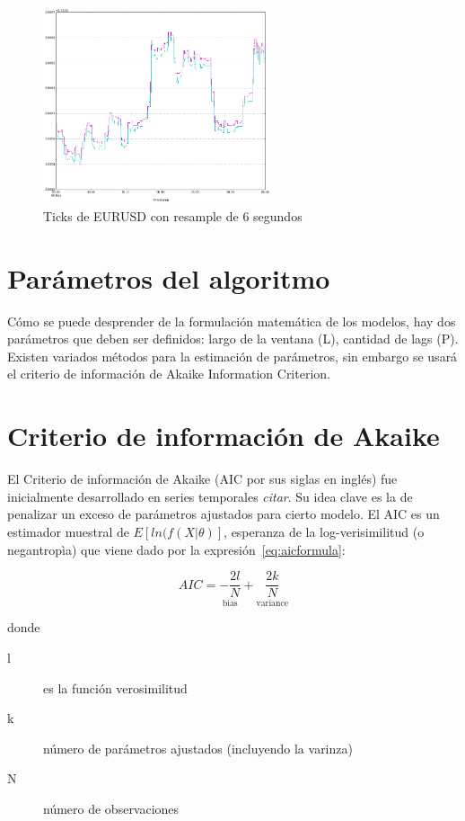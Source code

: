 \begin{figure}[h!t]
    \begin{center}
        \includegraphics[width=0.6\textwidth]{images/eurusd_6s}
        \caption{Ticks de EURUSD con resample de 6 segundos}
        \label{fig:eurusd_r6s}
    \end{center}
\end{figure}

\newpage
\section{Parámetros del algoritmo}
Cómo se puede desprender de la formulación matemática de los modelos, hay dos
parámetros que deben ser definidos: largo de la ventana (L), cantidad de lags
(P). Existen variados métodos para la estimación de parámetros, sin embargo se
usará el criterio de información de Akaike Information Criterion.

\section{Criterio de información de Akaike}
El Criterio de información de Akaike (AIC por sus siglas en inglés) fue
inicialmente desarrollado en series temporales \emph{citar}. Su idea clave es
la de penalizar un exceso de parámetros ajustados para cierto modelo. El AIC es
un estimador muestral de $E[ln(f(X|\theta)]$, esperanza de la log-verisimilitud
(o negantropìa) que viene dado por la expresión~\ref{eq:aicformula}:

\begin{equation}
\label{eq:aicformula}
AIC = \underset{\text{bias}}{-\frac{2l}{N}} + 
\underset{\text{variance}}{\frac{2k}{N}}
\end{equation}

\noindent donde

\begin{description}
\item[l] es la función verosimilitud
\item[k] número de parámetros ajustados (incluyendo la varinza)
\item[N] número de observaciones
\end{description}


